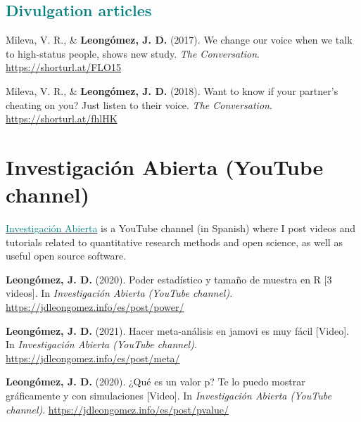 \documentclass[11pt, a4paper]{awesome-cv}
\begin{document}
\endgroup

\hypertarget{section-2}{%
\subsection{\texorpdfstring{\textcolor{teal}{Divulgation articles}}{}}\label{section-2}}

\begingroup
\setlength{\parindent}{-0.5in}
\setlength{\leftskip}{0.5in}

\hypertarget{refs_divulgation}{}
\leavevmode\hypertarget{ref-Mileva2017}{}%
Mileva, V. R., \& \textbf{Leongómez, J. D.} (2017). {We change our voice
when we talk to high-status people, shows new study}. \emph{The
Conversation}. \url{https://shorturl.at/FLO15}

\leavevmode\hypertarget{ref-Mileva2018}{}%
Mileva, V. R., \& \textbf{Leongómez, J. D.} (2018). {Want to know if
your partner's cheating on you? Just listen to their voice}. \emph{The
Conversation}. \url{https://shorturl.at/fhlHK}

\endgroup

\hypertarget{investigaciuxf3n-abierta-youtube-channel}{%
\section{Investigación Abierta (YouTube
channel)}\label{investigaciuxf3n-abierta-youtube-channel}}

\href{https://www.youtube.com/user/juanleongomez/featured}{\textcolor{teal}{Investigación Abierta}}
is a YouTube channel (in Spanish) where I post videos and tutorials
related to quantitative research methods and open science, as well as
useful open source software.

\begingroup
\setlength{\parindent}{-0.5in}
\setlength{\leftskip}{0.5in}

\hypertarget{refs_IA}{}
\leavevmode\hypertarget{ref-leongomezPower2020}{}%
\textbf{Leongómez, J. D.} (2020). {Poder estadístico y tamaño de muestra
en R {[}3 videos{]}}. In \emph{{Investigación Abierta (YouTube
channel)}}. \url{https://jdleongomez.info/es/post/power/}

\leavevmode\hypertarget{ref-investigacionabiertaHacerMetaanalisisJamovi2021}{}%
\textbf{Leongómez, J. D.} (2021). {Hacer meta-análisis en jamovi es muy
fácil {[}Video{]}}. In \emph{{Investigación Abierta (YouTube channel)}}.
\url{https://jdleongomez.info/es/post/meta/}

\leavevmode\hypertarget{ref-leongomezValorP2020}{}%
\textbf{Leongómez, J. D.} (2020). {¿Qué es un valor p? Te lo puedo
mostrar gráficamente y con simulaciones {[}Video{]}}. In
\emph{{Investigación Abierta (YouTube channel)}}.
\url{https://jdleongomez.info/es/post/pvalue/}
\end{document}
